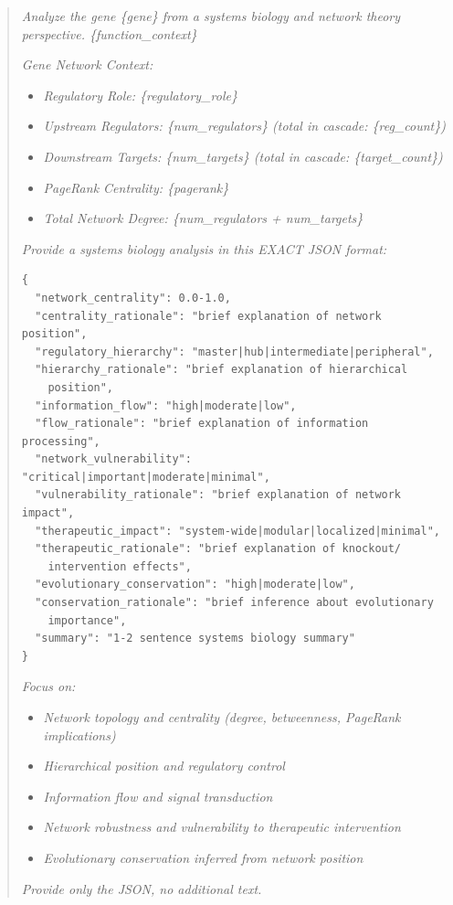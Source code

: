 \documentclass[11pt]{article}
\begin{document}
\begin{quote}
\textit{Analyze the gene \{gene\} from a systems biology and network theory perspective. \{function\_context\}}

\textit{Gene Network Context:}
\begin{itemize}
\item \textit{Regulatory Role: \{regulatory\_role\}}
\item \textit{Upstream Regulators: \{num\_regulators\} (total in cascade: \{reg\_count\})}
\item \textit{Downstream Targets: \{num\_targets\} (total in cascade: \{target\_count\})}
\item \textit{PageRank Centrality: \{pagerank\}}
\item \textit{Total Network Degree: \{num\_regulators + num\_targets\}}
\end{itemize}

\textit{Provide a systems biology analysis in this EXACT JSON format:}

\begin{verbatim}
{
  "network_centrality": 0.0-1.0,
  "centrality_rationale": "brief explanation of network position",
  "regulatory_hierarchy": "master|hub|intermediate|peripheral",
  "hierarchy_rationale": "brief explanation of hierarchical
    position",
  "information_flow": "high|moderate|low",
  "flow_rationale": "brief explanation of information processing",
  "network_vulnerability": "critical|important|moderate|minimal",
  "vulnerability_rationale": "brief explanation of network impact",
  "therapeutic_impact": "system-wide|modular|localized|minimal",
  "therapeutic_rationale": "brief explanation of knockout/
    intervention effects",
  "evolutionary_conservation": "high|moderate|low",
  "conservation_rationale": "brief inference about evolutionary
    importance",
  "summary": "1-2 sentence systems biology summary"
}
\end{verbatim}

\textit{Focus on:}
\begin{itemize}
\item \textit{Network topology and centrality (degree, betweenness, PageRank implications)}
\item \textit{Hierarchical position and regulatory control}
\item \textit{Information flow and signal transduction}
\item \textit{Network robustness and vulnerability to therapeutic intervention}
\item \textit{Evolutionary conservation inferred from network position}
\end{itemize}

\textit{Provide only the JSON, no additional text.}
\end{quote}
\end{document}
